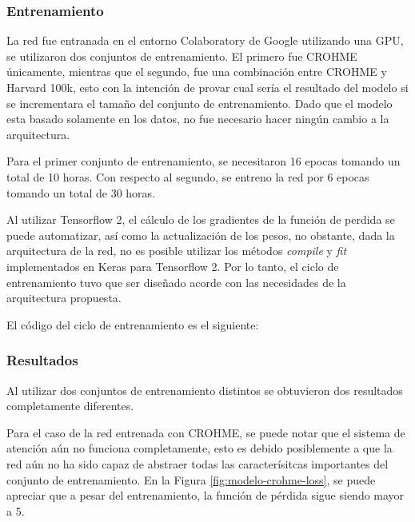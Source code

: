 



\subsubsection{Entrenamiento}

La red fue entranada en el entorno Colaboratory de Google utilizando una GPU, se utilizaron dos conjuntos de entrenamiento. El primero fue CROHME únicamente, mientras que el segundo, fue una combinación entre CROHME y Harvard 100k, esto con la intención de provar cual sería el resultado del modelo si se incrementara el tamaño del conjunto de entrenamiento. Dado que el modelo esta basado solamente en los datos, no fue necesario hacer ningún cambio a la arquitectura.

Para el primer conjunto de entrenamiento, se necesitaron 16 epocas tomando un total de 10 horas. Con respecto al segundo, se entreno la red por 6 epocas tomando un total de 30 horas.

Al utilizar Tensorflow 2, el cálculo de los gradientes de la función de perdida se puede automatizar, así como la actualización de los pesos, no obstante, dada la arquitectura de la red, no es posible utilizar los métodos \textit{compile} y \textit{fit} implementados en Keras para Tensorflow 2. Por lo tanto, el ciclo de entrenamiento tuvo que ser diseñado acorde con las necesidades de la arquitectura propuesta.

El código del ciclo de entrenamiento es el siguiente:



\subsubsection{Resultados}

Al utilizar dos conjuntos de entrenamiento distintos se obtuvieron dos resultados completamente diferentes.

Para el caso de la red entrenada con CROHME, se puede notar que el sistema de atención aún no funciona completamente, esto es debido posiblemente a que la red aún no ha sido capaz de abstraer todas las caracterísitcas importantes del conjunto de entrenamiento. En la Figura \ref{fig:modelo-crohme-loss}, se puede apreciar que a pesar del entrenamiento, la función de pérdida sigue siendo mayor a 5.

